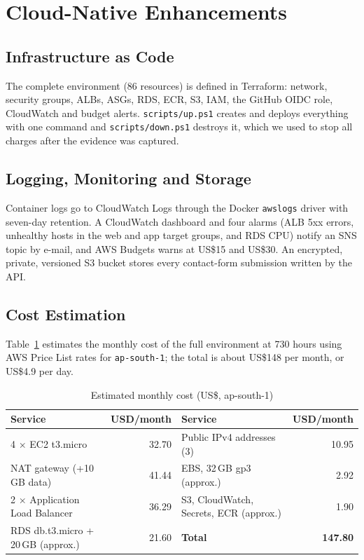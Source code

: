 \documentclass[10pt,a4paper]{article}
\newcommand{\hdr}{\rowcolor{rowblue}}
\begin{document}
\section{Cloud-Native Enhancements}
\subsection{Infrastructure as Code}
The complete environment (86 resources) is defined in Terraform: network, security groups, ALBs, ASGs, RDS, ECR, S3, IAM, the GitHub OIDC role,
CloudWatch and budget alerts. \texttt{scripts/up.ps1} creates and deploys everything with one command and \texttt{scripts/down.ps1} destroys it,
which we used to stop all charges after the evidence was captured.

\subsection{Logging, Monitoring and Storage}
Container logs go to CloudWatch Logs through the Docker \texttt{awslogs} driver with seven-day retention. A CloudWatch dashboard and four alarms
(ALB 5xx errors, unhealthy hosts in the web and app target groups, and RDS CPU) notify an SNS topic by e-mail, and AWS Budgets warns at US\$15 and US\$30.
An encrypted, private, versioned S3 bucket stores every contact-form submission written by the API.

\subsection{Cost Estimation}
Table~\ref{tab:cost} estimates the monthly cost of the full environment at 730 hours using AWS Price List rates for \texttt{ap-south-1}; the total is about
US\$148 per month, or US\$4.9 per day.

\begin{table}[H]
\centering\small
\caption{Estimated monthly cost (US\$, ap-south-1)}\label{tab:cost}
\begin{tabular}{@{}p{6.4cm} r p{5.4cm} r@{}}
\toprule
\hdr Service & USD/month & Service & USD/month\\
\midrule
4 $\times$ EC2 t3.micro & 32.70 & Public IPv4 addresses (3) & 10.95\\
NAT gateway (+10\,GB data) & 41.44 & EBS, 32\,GB gp3 (approx.) & 2.92\\
2 $\times$ Application Load Balancer & 36.29 & S3, CloudWatch, Secrets, ECR (approx.) & 1.90\\
RDS db.t3.micro + 20\,GB (approx.) & 21.60 & \textbf{Total} & \textbf{147.80}\\
\bottomrule
\end{tabular}
\end{table}
\end{document}
